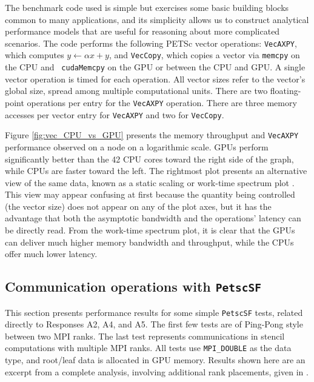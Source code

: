 \documentclass[10pt,journal,compsoc]{IEEEtran}
\begin{document}
The benchmark code used is
simple but exercises some basic building blocks common to many
applications, and its simplicity allows us to construct analytical performance
models that are useful for reasoning about more complicated scenarios. The code
performs the following PETSc vector operations: {\tt VecAXPY}, which computes $y
\leftarrow \alpha x + y$, %
and
{\tt VecCopy}, which copies a vector via {\tt memcpy} on the CPU and {\tt
cudaMemcpy} on the GPU or between the CPU and GPU.
A single vector operation is timed for each operation. All vector
sizes refer to the vector's global size, spread among multiple
computational units.
There are two floating-point operations per entry for the
{\tt VecAXPY} operation. There are three memory accesses per vector entry
for {\tt VecAXPY} and two for {\tt VecCopy}.


Figure \ref{fig:vec_CPU_vs_GPU} presents the memory throughput and {\tt VecAXPY}
performance observed on a node on a logarithmic scale.
GPUs perform significantly better than the 42 CPU
cores toward the right side of the graph, while CPUs are faster toward the left.
The rightmost plot presents an alternative view of the same data,
known as a static scaling or work-time spectrum plot
\cite{ChangPerformanceSpectrum,ChangTASSpectrum}. This view may appear confusing
at first because the quantity being controlled (the vector size) does not
appear on any of the plot axes, but it has the advantage that both the
asymptotic bandwidth and the operations' latency can be directly read.
From the work-time spectrum plot, it is  clear that the
GPUs can deliver much higher memory bandwidth and throughput, while the CPUs offer
much lower latency.

\subsection{Communication operations with {\tt PetscSF}}
This section presents performance results for some simple {\tt PetscSF} tests, related directly to Responses A2, A4, and A5.
The first few tests are of Ping-Pong style between two MPI ranks.
The last test represents communications in
stencil computations with multiple MPI ranks. All tests use
\texttt{MPI\_DOUBLE} as the data type, %
and root/leaf data is allocated in GPU memory.
Results shown here are an excerpt from a complete analysis, involving additional rank placements, given in \cite{sf-tech-report}.
\end{document}
